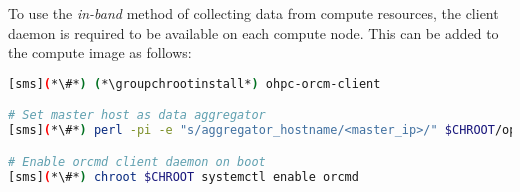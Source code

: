 To use the {\em in-band} method of collecting data from compute resources, the
\ORCM{} client daemon is required to be available on each compute node. This can
be added to the compute image as follows:

\begin{lstlisting}[language=bash,keywords={},upquote=true]
[sms](*\#*) (*\groupchrootinstall*) ohpc-orcm-client

# Set master host as data aggregator
[sms](*\#*) perl -pi -e "s/aggregator_hostname/<master_ip>/" $CHROOT/opt/open-rcm/etc/orcm-site.xml

# Enable orcmd client daemon on boot
[sms](*\#*) chroot $CHROOT systemctl enable orcmd
\end{lstlisting}
